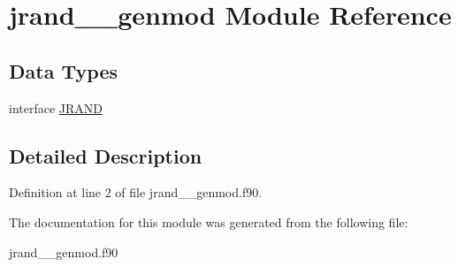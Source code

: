 \hypertarget{classjrand____genmod}{\section{jrand\+\_\+\+\_\+genmod Module Reference}
\label{classjrand____genmod}
}
\subsection*{Data Types}
\begin{DoxyCompactItemize}
\item 
interface \hyperlink{interfacejrand____genmod_1_1_j_r_a_n_d}{J\+R\+A\+N\+D}
\end{DoxyCompactItemize}


\subsection{Detailed Description}


Definition at line 2 of file jrand\+\_\+\+\_\+genmod.\+f90.



The documentation for this module was generated from the following file\+:\begin{DoxyCompactItemize}
\item 
jrand\+\_\+\+\_\+genmod.\+f90\end{DoxyCompactItemize}
